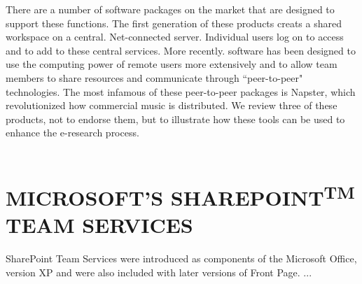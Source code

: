 \documentclass[a4paper,12pt]{article}
\begin{document}
	There are a number of software packages on the market that are designed to support these functions. The first generation of these products creats a shared workspace
	on a central. Net-connected server. Individual users log on to access and to add to
	these central services. More recently. software has been designed to use the computing power of remote users more extensively and to allow team members to share
	resources and communicate through “peer-to-peer" technologies. The most infamous
	of these peer-to-peer packages is Napster, which revolutionized how commercial
	music is distributed. We review three of these products, not to endorse them, but to illustrate how these tools can be used to enhance the e-research process.\\
	\\
	\section{MICROSOFT'S SHAREPOINT\textsuperscript{TM} TEAM SERVICES}
	SharePoint Team Services were introduced as components of the Microsoft Office,
	version XP and were also included with later versions of Front Page. ...
\end{document}
